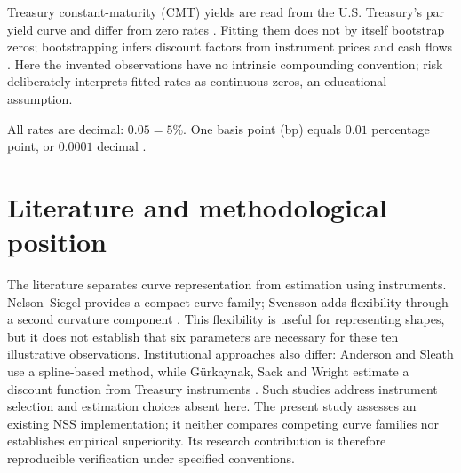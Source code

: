 Treasury constant-maturity (CMT) yields are read from the U.S. Treasury's par yield curve and differ from zero rates \parencite{treasuryCmt}. Fitting them does not by itself bootstrap zeros; bootstrapping infers discount factors from instrument prices and cash flows \parencite{bis2005,tuckman2011}. Here the invented observations have no intrinsic compounding convention; risk deliberately interprets fitted rates as continuous zeros, an educational assumption.

\label{sec:units}
All rates are decimal: \(0.05=5\%\). One basis point (bp) equals \(0.01\) percentage point, or \(0.0001\) decimal \parencite{tuckman2011}.

\section{Literature and methodological position}
The literature separates curve representation from estimation using instruments. Nelson--Siegel provides a compact curve family; Svensson adds flexibility through a second curvature component \parencite{nelson1987,svensson1994}. This flexibility is useful for representing shapes, but it does not establish that six parameters are necessary for these ten illustrative observations. Institutional approaches also differ: Anderson and Sleath use a spline-based method, while G\"urkaynak, Sack and Wright estimate a discount function from Treasury instruments \parencite{anderson2001,gurkaynak2007}. Such studies address instrument selection and estimation choices absent here. The present study assesses an existing NSS implementation; it neither compares competing curve families nor establishes empirical superiority. Its research contribution is therefore reproducible verification under specified conventions.
